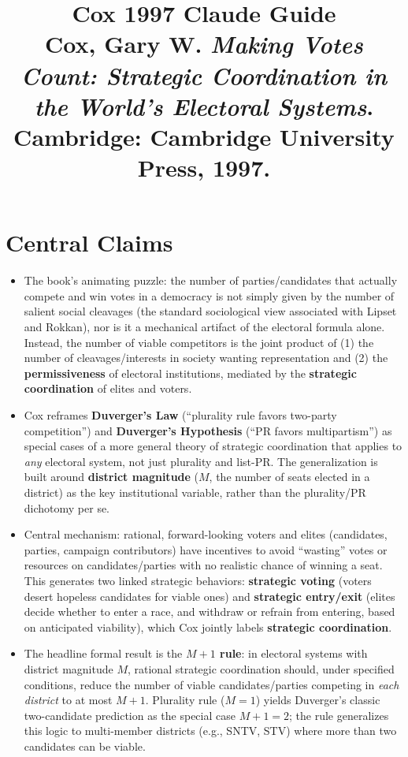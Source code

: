 \documentclass[12pt]{article}
\title{\textbf{Cox 1997 Claude Guide}\\
\large Cox, Gary W. \textit{Making Votes Count: Strategic Coordination in the World's Electoral Systems}.\\
Cambridge: Cambridge University Press, 1997.}
\author{}
\date{}
\begin{document}
\maketitle
\tableofcontents
\newpage

\section{Central Claims}

\begin{itemize}[leftmargin=*, itemsep=4pt]
    \item The book's animating puzzle: the number of parties/candidates that actually compete and win votes in a democracy is not simply given by the number of salient social cleavages (the standard sociological view associated with Lipset and Rokkan), nor is it a mechanical artifact of the electoral formula alone. Instead, the number of viable competitors is the joint product of (1) the number of cleavages/interests in society wanting representation and (2) the \textbf{permissiveness} of electoral institutions, mediated by the \textbf{strategic coordination} of elites and voters.
    \item Cox reframes \textbf{Duverger's Law} (``plurality rule favors two-party competition'') and \textbf{Duverger's Hypothesis} (``PR favors multipartism'') as special cases of a more general theory of strategic coordination that applies to \emph{any} electoral system, not just plurality and list-PR. The generalization is built around \textbf{district magnitude} ($M$, the number of seats elected in a district) as the key institutional variable, rather than the plurality/PR dichotomy per se.
    \item Central mechanism: rational, forward-looking voters and elites (candidates, parties, campaign contributors) have incentives to avoid ``wasting'' votes or resources on candidates/parties with no realistic chance of winning a seat. This generates two linked strategic behaviors: \textbf{strategic voting} (voters desert hopeless candidates for viable ones) and \textbf{strategic entry/exit} (elites decide whether to enter a race, and withdraw or refrain from entering, based on anticipated viability), which Cox jointly labels \textbf{strategic coordination}.
    \item The headline formal result is the \textbf{$M+1$ rule}: in electoral systems with district magnitude $M$, rational strategic coordination should, under specified conditions, reduce the number of viable candidates/parties competing in \emph{each district} to at most $M+1$. Plurality rule ($M=1$) yields Duverger's classic two-candidate prediction as the special case $M+1=2$; the rule generalizes this logic to multi-member districts (e.g., SNTV, STV) where more than two candidates can be viable.

\end{itemize}
\end{document}
